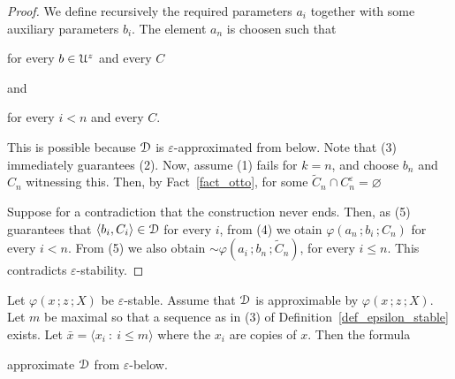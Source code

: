 \begin{proof}
  We define recursively the required parameters $a_i$ together with some auxiliary parameters $b_i$.
  The element $a_n$ is choosen such that

\hfill for every $b\in{\EuScript U}^z$ and every $C$

and

\hfill for every $i<n$ and every $C$.\smallskip

This is possible because ${\EuScript D}$ is $\varepsilon$-approximated from below.
Note that (3) immediately guarantees (2).
Now, assume (1) fails for $k=n$, and choose $b_n$ and $C_n$ witnessing this.
Then, by Fact~\ref{fact_otto}, for some $\tilde C_n\cap C_n^\varepsilon=\varnothing$


Suppose for a contradiction that the construction never ends.
Then, as (5) guarantees that $\langle b_i,C_i\rangle\in{\EuScript D}$ for every $i$, from (4) we otain $\varphi(a_n\,;b_i\,;C_n)$ for every $i<n$.
From (5) we also obtain ${\sim}\varphi(a_i\,;b_n\,;\tilde C_n)$, for every $i\le n$.
This contradicts $\varepsilon$-stability.
\end{proof}

\begin{lemma}
  Let $\varphi(x\,;z\,;X)$ be $\varepsilon$-stable.
  Assume that ${\EuScript D}$ is approximable by $\varphi(x\,;z\,;X)$.
  Let $m$ be maximal so that a sequence as in (3) of Definition~\ref{def_epsilon_stable} exists.
  Let $\bar x=\langle x_i\ :\ i\le m\rangle$ where the $x_i$ are copies of $x$.
  Then the formula\smallskip

  \smallskip

  approximate ${\EuScript D}$ from $\varepsilon$-below.
\end{lemma}

